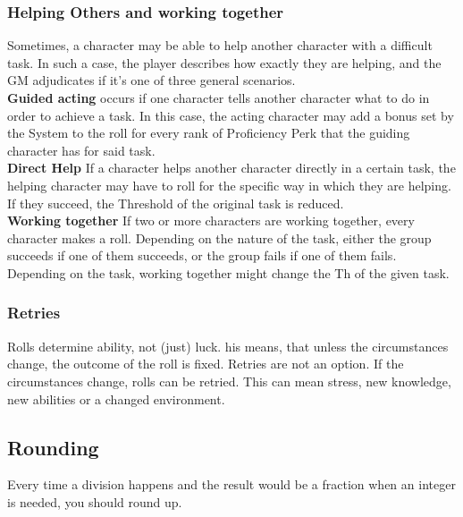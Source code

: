 \subsubsection{Helping Others and working together}\label{subsubsec:helping}
Sometimes, a character may be able to help another character with a difficult task.
In such a case, the player describes how exactly they are helping, and the GM adjudicates if it's one of three general scenarios.\\
\textbf{Guided acting} occurs if one character tells another character what to do in order to achieve a task.
In this case, the acting character may add a bonus set by the System to the roll for every rank of Proficiency Perk that the guiding character has for said task.\\
\textbf{Direct Help} If a character helps another character directly in a certain task, the helping character may have to roll for the specific way in which they are helping.
If they succeed, the Threshold of the original task is reduced.\\
\textbf{Working together} If two or more characters are working together, every character makes a roll.
Depending on the nature of the task, either the group succeeds if one of them succeeds, or the group fails if one of them fails.\\
Depending on the task, working together might change the Th of the given task.\\

\subsubsection{Retries}\label{subsubsec:retries}
Rolls determine ability, not (just) luck.
his means, that unless the circumstances change, the outcome of the roll is fixed.
Retries are not an option.
If the circumstances change, rolls can be retried.
This can mean stress, new knowledge, new abilities or a changed environment.


\subsection{Rounding}\label{subsec:rounding}
Every time a division happens and the result would be a fraction when an integer is needed, you should round up.

